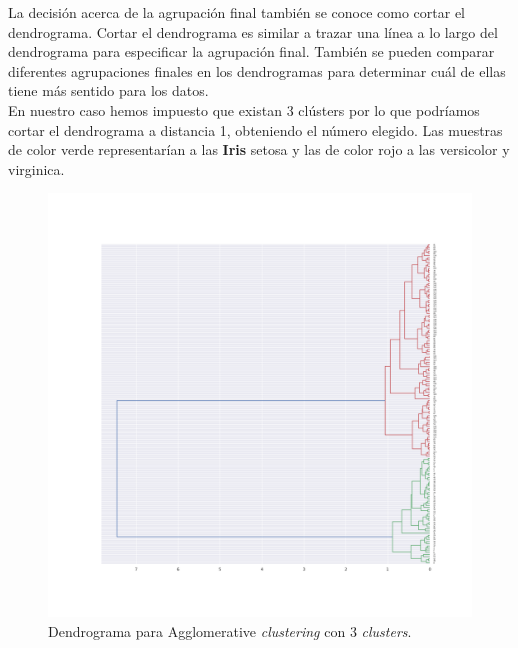 \documentclass[a4paper, 20pt]{article}
\begin{document}
{La decisión acerca de la agrupación final también se conoce como cortar el dendrograma. Cortar el dendrograma es similar a trazar una línea a lo largo del dendrograma para especificar la agrupación final. También se pueden comparar diferentes agrupaciones finales en los dendrogramas para determinar cuál de ellas tiene más sentido para los datos.\\

En nuestro caso hemos impuesto que existan 3 clústers por lo que podríamos cortar el dendrograma a distancia 1, obteniendo el número elegido. Las muestras de color verde representarían a las \textbf{Iris} setosa y las de color rojo a las versicolor y virginica.

\begin{figure}[h]
\centering
\includegraphics[scale=0.35]{dani/dendrogramAggClusterIRIS.png}
\caption{Dendrograma para Agglomerative \textit{clustering} con 3 \textit{clusters}.}
\label{dac}
\end{figure}

\clearpage

}
\end{document}
